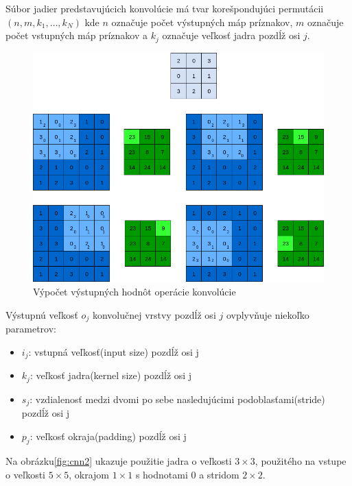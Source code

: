 \indent Súbor jadier predstavujúcich konvolúcie má tvar korešpondujúci permutácii $(n, m, k_{1}, \dots, k_{N})$ kde $n$ označuje počet výstupných máp príznakov, $m$ označuje počet vstupných máp príznakov a $k_{j}$ označuje veľkosť jadra pozdĺž osi $j$.\cite{dumoulin2016guide}

 
\begin{figure}[H]
	\centering
	\includegraphics[width=1\linewidth]{img/cnn1}
	\caption{Výpočet výstupných hodnôt operácie konvolúcie}
	\label{fig:cnn1}
\end{figure}

\indent Výstupnú veľkosť $o_{j}$ konvolučnej vrstvy pozdĺž osi $j$ ovplyvňuje niekoľko parametrov:

\begin{itemize}
	\item $i_{j}$: vstupná veľkosť(input size) pozdĺž osi j
	\item $k_{j}$: veľkosť jadra(kernel size) pozdĺž osi j
	\item $s_{j}$: vzdialenosť medzi dvomi po sebe nasledujúcimi podoblasťami(stride) pozdĺž osi j
	\item $p_{j}$: veľkosť okraja(padding) pozdĺž osi j
\end{itemize}

\indent Na obrázku\ref{fig:cnn2} ukazuje použitie jadra  o veľkosti $3 \times 3$, použitého na vstupe o veľkosti $5 \times 5$, okrajom $1 \times 1$ s hodnotami $0$ a stridom $2 \times 2$.

